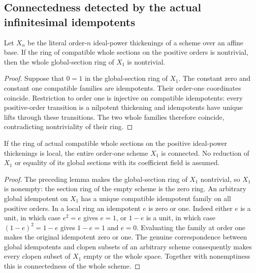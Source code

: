 \subsection{Connectedness detected by the actual infinitesimal idempotents}

\begin{lemma}
\label{lem:fc-compatible-sections-nontrivial-first-model}
\leanok
{}
Let $X_n$ be the literal order-$n$ ideal-power thickenings of a scheme over
an affine base. If the ring of compatible whole sections on the positive
orders is nontrivial, then the whole global-section ring of $X_1$ is
nontrivial.
\end{lemma}
\begin{proof}
Suppose that $0=1$ in the global-section ring of $X_1$. The constant zero
and constant one compatible families are idempotents. Their order-one
coordinates coincide. Restriction to order one is injective on compatible
idempotents: every positive-order transition is a nilpotent thickening and
idempotents have unique lifts through these transitions. The two whole
families therefore coincide, contradicting nontriviality of their ring.
\end{proof}

\begin{theorem}
\label{thm:fc-compatible-local-sections-connected-first-model}
\leanok
{}
If the ring of actual compatible whole sections on the positive
ideal-power thickenings is local, the entire order-one scheme $X_1$ is
connected. No reduction of $X_1$ or equality of its global sections with
its coefficient field is assumed.
\end{theorem}
\begin{proof}
The preceding lemma makes the global-section ring of $X_1$ nontrivial, so
$X_1$ is nonempty: the section ring of the empty scheme is the zero ring.
An arbitrary global idempotent on $X_1$ has a unique compatible idempotent
family on all positive orders. In a local ring an idempotent $e$ is zero or
one. Indeed either $e$ is a unit, in which case $e^2=e$ gives $e=1$, or
$1-e$ is a unit, in which case $(1-e)^2=1-e$ gives $1-e=1$ and $e=0$.
Evaluating the family at order one makes the original idempotent zero or
one. The genuine correspondence between global idempotents and clopen
subsets of an arbitrary scheme consequently makes every clopen subset of
$X_1$ empty or the whole space. Together with nonemptiness this is
connectedness of the whole scheme.
\end{proof}
